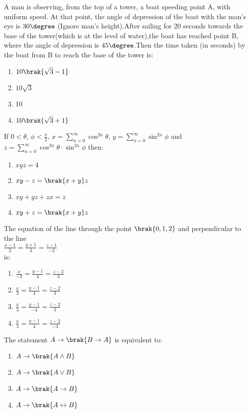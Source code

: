 \item A man is observing, from the top of a tower, a boat speeding point A, with uniform speed. At that point, the angle of depression of the boat with the man's eye is $30\degree$ (Ignore man's height).After sailing for 20 seconds towards the base of the tower(which is at the level of water),the boat has reached point B, where the angle of depression is $45\degree$.Then the time taken (in seconds) by the boat from B to reach the base of the tower is$\colon$ \hfill{}
\begin{enumerate}
    \item $10\brak{\sqrt{3}-1}$
    \item $10\sqrt{3}$
    \item 10
    \item $10\brak{\sqrt{3}+1}$
\end{enumerate}
\item If $0\!<\theta, \, \phi < \frac{\pi}{2}, \,x=\sum_{n=0}^{\infty} \cos^{2n} \theta, \, y = \sum_{n=0}^{\infty} \sin^{2n} \phi $ and $z = \sum_{n=0}^{\infty} \cos^{2n} \theta \cdot \sin^{2n} \phi$ then$\colon$ \hfill{}
\begin{enumerate}
    \item $xyz=4$
    \item $xy-z=\brak{x+y}z$
    \item $xy+yz+zx=z$
    \item $xy+z=\brak{x+y}z$
\end{enumerate}
\item The equation of the line through the point $\brak{0,1,2}$ and perpendicular to the line\\$\frac{x-1}{2}=\frac{y+1}{3}=\frac{z-1}{-2}$\\is$\colon$ \hfill{}
\begin{enumerate}
    \item $\frac{x}{-3}=\frac{y-1}{4}=\frac{z-2}{3}$
    \item $\frac{x}{3}=\frac{y-1}{4}=\frac{z-2}{3}$
    \item $\frac{x}{3}=\frac{y-1}{-4}=\frac{z-2}{3}$
    \item $\frac{x}{3}=\frac{y-1}{4}=\frac{z-2}{-3}$
\end{enumerate}
\item The statement $A\to\brak{B\to A}$ is equivalent to$\colon$ \hfill{}
\begin{enumerate}
    \item $A\to\brak{A\land B}$
    \item $A\to\brak{A\lor B}$
    \item $A\to\brak{A\to B}$
    \item $A\to\brak{A\leftrightarrow B}$
\end{enumerate}
